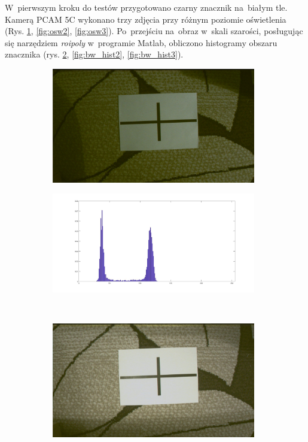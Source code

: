 W~pierwszym kroku do testów przygotowano czarny znacznik na~białym tle. 
Kamerą PCAM 5C wykonano trzy zdjęcia przy różnym poziomie oświetlenia (Rys. \ref{fig:osw1}, \ref{fig:osw2}, \ref{fig:osw3}). %
Po~przejściu na~obraz w~skali szarości, posługując się narzędziem \textit{roipoly} w~programie Matlab, obliczono histogramy obszaru znacznika (rys. \ref{fig:bw_hist1}, \ref{fig:bw_hist2}, \ref{fig:bw_hist3}).\\
\begin{figure}
	\centering
	\begin{subfigure}{0.4\textwidth}
		\centering
		\includegraphics[width=0.98\textwidth]{rgb_ciemny.jpg}
		\caption{}
		\label{fig:osw1}
	\end{subfigure}%
	\begin{subfigure}{0.55\textwidth}
		\centering
		\includegraphics[width=0.98\textwidth]{bw_hist1.jpg}
		\caption{}
		\label{fig:bw_hist1}
	\end{subfigure}\\
	\begin{subfigure}{0.4\textwidth}
		\centering
		\includegraphics[width=0.98\textwidth]{rgb_sredni.jpg}

\end{subfigure}
\end{figure}
